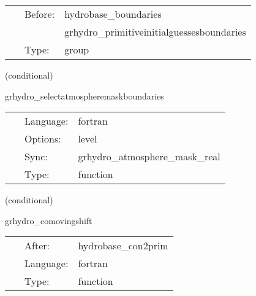 \hspace{5mm}{\it apply boundary conditions to primitives } 


\hspace{5mm}

 \begin{tabular*}{160mm}{cll} 
~ & Before:  & hydrobase\_boundaries \\ 
~& ~ &grhydro\_primitiveinitialguessesboundaries\\ 
~ & Type:  & group \\ 
\end{tabular*} 


\vspace{5mm}

   (conditional) 

\hspace{5mm} grhydro\_selectatmospheremaskboundaries 

\hspace{5mm}{\it select atmosphere mask for boundary conditions } 


\hspace{5mm}

 \begin{tabular*}{160mm}{cll} 
~ & Language:  & fortran \\ 
~ & Options:  & level \\ 
~ & Sync:  & grhydro\_atmosphere\_mask\_real \\ 
~ & Type:  & function \\ 
\end{tabular*} 


\vspace{5mm}

   (conditional) 

\hspace{5mm} grhydro\_comovingshift 

\hspace{5mm}{\it comoving shift } 


\hspace{5mm}

 \begin{tabular*}{160mm}{cll} 
~ & After:  & hydrobase\_con2prim \\ 
~ & Language:  & fortran \\ 
~ & Type:  & function \\ 
\end{tabular*} 


\vspace{5mm}

